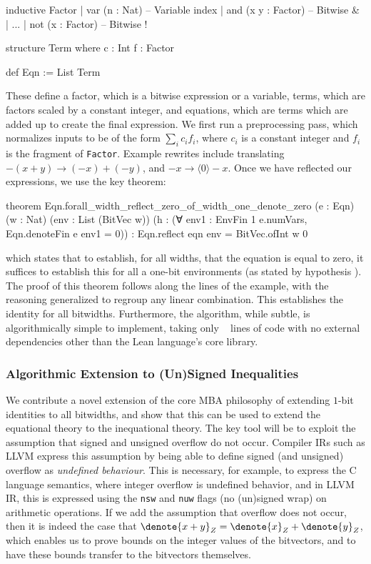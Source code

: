 \begin{lean}
inductive Factor
| var (n : Nat) -- Variable index
| and (x y : Factor) -- Bitwise &
| ...
| not (x : Factor) -- Bitwise !

structure Term where
  c : Int
  f : Factor

def Eqn := List Term
\end{lean}

These define a factor, which is a bitwise expression or a variable, terms, which are factors
scaled by a constant integer, and equations, which are terms which are added up to create
the final expression. We first run a preprocessing pass, which normalizes inputs to be of
the form $\sum_i c_i f_i$, where $c_i$ is a constant integer and $f_i$ is the fragment of \texttt{Factor}.
Example rewrites include translating $- (x + y) \to (-x) + (-y)$, and $-x \to \langle 0 \rangle - x$.
Once we have reflected our expressions, we use the key theorem:
%
\begin{lean}
theorem Eqn.forall_width_reflect_zero_of_width_one_denote_zero
    (e : Eqn) (w : Nat) (env : List (BitVec w))
    (h : (∀ env1 : EnvFin 1 e.numVars, Eqn.denoteFin e env1 = 0)) :
    Eqn.reflect eqn env = BitVec.ofInt w 0
\end{lean}
%
which states that to establish, for all widths, that the equation  is equal to zero,
it suffices to establish this for all a one-bit environments (as stated by hypothesis ).
The proof of this theorem follows along the lines of the example, with the reasoning generalized
to regroup any linear combination. This establishes the identity for all bitwidths.
Furthermore, the algorithm, while subtle, is algorithmically simple to implement,
taking only ~\MBATotalLines{} lines of code with no external dependencies other than
the Lean language's core library.

\subsubsection{Algorithmic Extension to (Un)Signed Inequalities}

We contribute a novel extension of the core MBA philosophy of extending $1$-bit identities to all bitwidths,
and show that this can be used to extend the equational theory to the inequational theory.
The key tool will be to exploit the assumption that signed and unsigned overflow do not occur.
Compiler IRs such as LLVM express this assumption by being able to define signed (and unsigned) overflow as \emph{undefined behaviour}.
This is necessary, for example, to express the C language semantics, where integer overflow is undefined behavior,
and in LLVM IR, this is expressed using the \texttt{nsw} and \texttt{nuw} flags (no (un)signed wrap) on arithmetic operations.
If we add the assumption that overflow does not occur, then it is indeed the case that $\denote{x + y}_Z = \denote{x}_Z + \denote{y}_Z$,
which enables us to prove bounds on the integer values of the bitvectors, and to have these bounds transfer to the bitvectors themselves.

